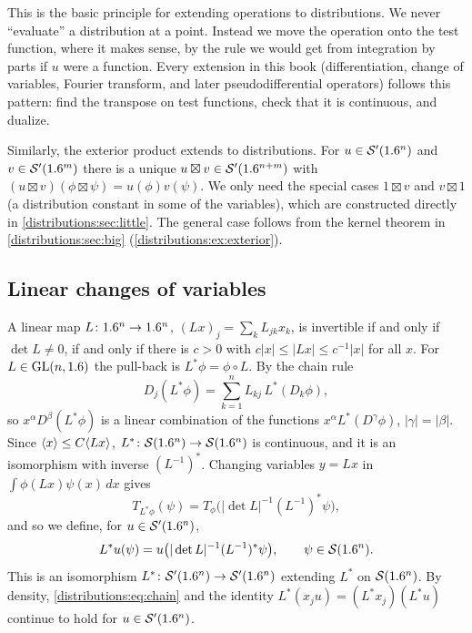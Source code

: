 \begin{discussion}
This is the basic principle for extending operations to distributions. We never
``evaluate'' a distribution at a point. Instead we move the operation onto the test
function, where it makes sense, by the rule we would get from integration by parts if
$u$ were a function. Every extension in this book (differentiation, change of
variables, Fourier transform, and later pseudodifferential operators) follows this
pattern: find the transpose on test functions, check that it is continuous, and dualize.
\end{discussion}

Similarly, the exterior product extends to distributions. For $u\in\mathcal{S}'(1.6^n)$ and
$v\in\mathcal{S}'(1.6^m)$ there is a unique $u\boxtimes v\in\mathcal{S}'(1.6^{n+m})$ with
$(u\boxtimes v)(\phi\boxtimes\psi)=u(\phi)v(\psi)$. We only need the special cases
$1\boxtimes v$ and $v\boxtimes1$ (a distribution constant in some of the variables), which are constructed directly in \cref{distributions:sec:little}. The
general case follows from the kernel theorem in \cref{distributions:sec:big}
(\cref{distributions:ex:exterior}).

\subsection{Linear changes of variables}
A linear map $L\colon1.6^n\to1.6^n$, $(Lx)_j=\sum_kL_{jk}x_k$, is invertible if and only if
$\det L\neq0$, if and only if there is $c>0$ with $c|x|\le|Lx|\le c^{-1}|x|$ for all
$x$. For $L\in\operatorname{GL}(n,1.6)$ the pull-back is $L^*\phi=\phi\circ L$. By the chain rule
\begin{equation}\label{distributions:eq:chain}
  D_j(L^*\phi)=\sum_{k=1}^nL_{kj}\,L^*(D_k\phi),
\end{equation}
so $x^\alpha D^\beta(L^*\phi)$ is a linear combination of the functions
$x^\alpha L^*(D^\gamma\phi)$, $|\gamma|=|\beta|$. Since $\langle x\rangle\le C\langle Lx\rangle$,
$L^*\colon\mathcal{S}(1.6^n)\to\mathcal{S}(1.6^n)$ is continuous, and it is an isomorphism with inverse
$(L^{-1})^*$. Changing variables $y=Lx$ in $\int\phi(Lx)\psi(x)\,dx$ gives
\begin{equation}\label{distributions:eq:pullback}
  T_{L^*\phi}(\psi)=T_\phi\big(|\det L|^{-1}(L^{-1})^*\psi\big),
\end{equation}
and so we define, for $u\in\mathcal{S}'(1.6^n)$,
\[
  L^*u(\psi)=u\big(|\det L|^{-1}(L^{-1})^*\psi\big),\qquad\psi\in\mathcal{S}(1.6^n).
\]
This is an isomorphism $L^*\colon\mathcal{S}'(1.6^n)\to\mathcal{S}'(1.6^n)$ extending $L^*$ on
$\mathcal{S}(1.6^n)$. By density, \eqref{distributions:eq:chain} and the identity
$L^*(x_ju)=(L^*x_j)(L^*u)$ continue to hold for $u\in\mathcal{S}'(1.6^n)$.

